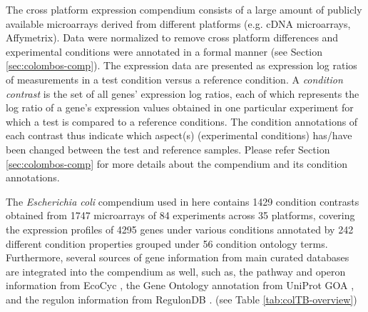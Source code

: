 The cross platform expression compendium consists of a large amount of publicly 
available microarrays derived from different platforms (e.g. cDNA microarrays, 
Affymetrix). 
Data were normalized to remove cross platform differences and 
experimental conditions were annotated in a formal manner (see Section 
\ref{sec:colombos-comp}).
The expression data are presented as expression log ratios of measurements in a 
test condition versus a reference condition.
A \textit{condition contrast} is the set of all 
genes' expression log ratios, each of which represents the log ratio of a 
gene's expression values obtained in one particular experiment for which a test 
is compared to a reference conditions. 
The condition annotations of each contrast thus indicate which aspect(s) 
(experimental conditions) has/have been changed between the test and reference 
samples.  
Please refer Section \ref{sec:colombos-comp} for more details about 
the compendium and its condition annotations.

The \textit{Escherichia coli} compendium used in here  
contains 1429 condition contrasts obtained from 1747 microarrays of 84 
experiments across 35 platforms, covering the expression profiles of 4295 genes 
under various conditions annotated by 242 different condition properties 
grouped under 56 condition ontology terms.
Furthermore, several sources of gene information from main curated databases 
are integrated into the compendium as well, such as, the pathway and operon 
information from EcoCyc \cite{Keseler2009}, the Gene Ontology annotation from 
UniProt GOA \cite{Camon2004}, and the regulon information from RegulonDB 
\cite{Gama-Castro2008}. (see Table \ref{tab:colTB-overview})

